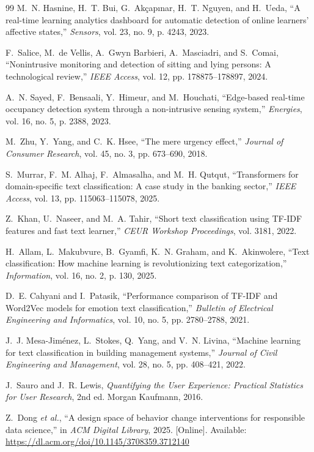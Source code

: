 \documentclass[conference]{IEEEtran}
\begin{document}
\begin{thebibliography}{99}
M.~N. Hasnine, H.~T. Bui, G.~Akçapınar, H.~T. Nguyen, and H.~Ueda, ``A real-time learning analytics dashboard for automatic detection of online learners' affective states,'' \emph{Sensors}, vol. 23, no. 9, p. 4243, 2023.

F.~Salice, M.~de Vellis, A.~Gwyn Barbieri, A.~Masciadri, and S.~Comai, ``Nonintrusive monitoring and detection of sitting and lying persons: A technological review,'' \emph{IEEE Access}, vol. 12, pp. 178875--178897, 2024.

A.~N. Sayed, F.~Bensaali, Y.~Himeur, and M.~Houchati, ``Edge-based real-time occupancy detection system through a non-intrusive sensing system,'' \emph{Energies}, vol. 16, no. 5, p. 2388, 2023.

M.~Zhu, Y.~Yang, and C.~K. Hsee, ``The mere urgency effect,'' \emph{Journal of Consumer Research}, vol. 45, no. 3, pp. 673--690, 2018.

S.~Murrar, F.~M. Alhaj, F.~Almasalha, and M.~H. Qutqut, ``Transformers for domain-specific text classification: A case study in the banking sector,'' \emph{IEEE Access}, vol. 13, pp. 115063--115078, 2025.

Z.~Khan, U.~Naseer, and M.~A. Tahir, ``Short text classification using TF-IDF features and fast text learner,'' \emph{CEUR Workshop Proceedings}, vol. 3181, 2022.

H.~Allam, L.~Makubvure, B.~Gyamfi, K.~N. Graham, and K.~Akinwolere, ``Text classification: How machine learning is revolutionizing text categorization,'' \emph{Information}, vol. 16, no. 2, p. 130, 2025.

D.~E. Cahyani and I.~Patasik, ``Performance comparison of TF-IDF and Word2Vec models for emotion text classification,'' \emph{Bulletin of Electrical Engineering and Informatics}, vol. 10, no. 5, pp. 2780--2788, 2021.

J.~J. Mesa-Jiménez, L.~Stokes, Q.~Yang, and V.~N. Livina, ``Machine learning for text classification in building management systems,'' \emph{Journal of Civil Engineering and Management}, vol. 28, no. 5, pp. 408--421, 2022.

J.~Sauro and J.~R. Lewis, \emph{Quantifying the User Experience: Practical Statistics for User Research}, 2nd ed. Morgan Kaufmann, 2016.

Z.~Dong \emph{et al.}, ``A design space of behavior change interventions for responsible data science,'' in \emph{ACM Digital Library}, 2025. [Online]. Available: \url{https://dl.acm.org/doi/10.1145/3708359.3712140}


\end{thebibliography}
\end{document}
